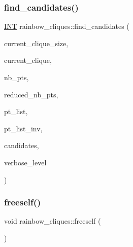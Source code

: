 \subsubsection{\texorpdfstring{find\+\_\+candidates()}{find\_candidates()}}
{\footnotesize\ttfamily \mbox{\hyperlink{galois_8h_a09fddde158a3a20bd2dcadb609de11dc}{I\+NT}} rainbow\+\_\+cliques\+::find\+\_\+candidates (\begin{DoxyParamCaption}\item[{\mbox{\hyperlink{galois_8h_a09fddde158a3a20bd2dcadb609de11dc}{I\+NT}}}]{current\+\_\+clique\+\_\+size,  }\item[{\mbox{\hyperlink{galois_8h_a09fddde158a3a20bd2dcadb609de11dc}{I\+NT}} $\ast$}]{current\+\_\+clique,  }\item[{\mbox{\hyperlink{galois_8h_a09fddde158a3a20bd2dcadb609de11dc}{I\+NT}}}]{nb\+\_\+pts,  }\item[{\mbox{\hyperlink{galois_8h_a09fddde158a3a20bd2dcadb609de11dc}{I\+NT}} \&}]{reduced\+\_\+nb\+\_\+pts,  }\item[{\mbox{\hyperlink{galois_8h_a09fddde158a3a20bd2dcadb609de11dc}{I\+NT}} $\ast$}]{pt\+\_\+list,  }\item[{\mbox{\hyperlink{galois_8h_a09fddde158a3a20bd2dcadb609de11dc}{I\+NT}} $\ast$}]{pt\+\_\+list\+\_\+inv,  }\item[{\mbox{\hyperlink{galois_8h_a09fddde158a3a20bd2dcadb609de11dc}{I\+NT}} $\ast$}]{candidates,  }\item[{\mbox{\hyperlink{galois_8h_a09fddde158a3a20bd2dcadb609de11dc}{I\+NT}}}]{verbose\+\_\+level }\end{DoxyParamCaption})}

\mbox{\label{classrainbow__cliques_ad80bc5cd0e763b021717dffdeeeb3982}} 
\subsubsection{\texorpdfstring{freeself()}{freeself()}}
{\footnotesize\ttfamily void rainbow\+\_\+cliques\+::freeself (\begin{DoxyParamCaption}{ }\end{DoxyParamCaption})}

\mbox{\label{classrainbow__cliques_a3b0ab87c2529f70e1a59a2a85b97701b}} 
